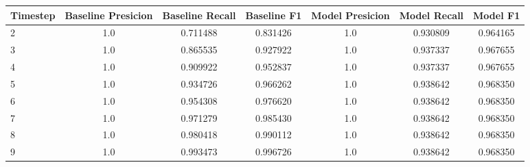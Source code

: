 \begin{tabular}{lcccccc}
\toprule
 Timestep &  Baseline Presicion &  Baseline Recall &  Baseline F1 &  Model Presicion &  Model Recall &  Model F1 \\
\midrule
        2 &                 1.0 &         0.711488 &     0.831426 &              1.0 &      0.930809 &  0.964165 \\
        3 &                 1.0 &         0.865535 &     0.927922 &              1.0 &      0.937337 &  0.967655 \\
        4 &                 1.0 &         0.909922 &     0.952837 &              1.0 &      0.937337 &  0.967655 \\
        5 &                 1.0 &         0.934726 &     0.966262 &              1.0 &      0.938642 &  0.968350 \\
        6 &                 1.0 &         0.954308 &     0.976620 &              1.0 &      0.938642 &  0.968350 \\
        7 &                 1.0 &         0.971279 &     0.985430 &              1.0 &      0.938642 &  0.968350 \\
        8 &                 1.0 &         0.980418 &     0.990112 &              1.0 &      0.938642 &  0.968350 \\
        9 &                 1.0 &         0.993473 &     0.996726 &              1.0 &      0.938642 &  0.968350 \\
\bottomrule
\end{tabular}
